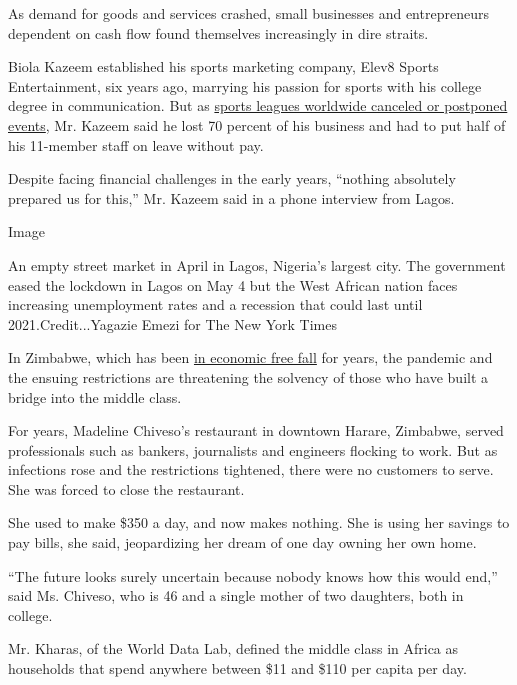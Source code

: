 As demand for goods and services crashed, small businesses and
entrepreneurs dependent on cash flow found themselves increasingly in
dire straits.

Biola Kazeem established his sports marketing company, Elev8 Sports
Entertainment, six years ago, marrying his passion for sports with his
college degree in communication. But as
\href{https://www.nytimes.com/article/coronavirus-sports-leagues-returning-canceled.html}{sports
leagues worldwide canceled or postponed events}, Mr. Kazeem said he lost
70 percent of his business and had to put half of his 11-member staff on
leave without pay.

Despite facing financial challenges in the early years, ``nothing
absolutely prepared us for this,'' Mr. Kazeem said in a phone interview
from Lagos.

Image

An empty street market in April in Lagos, Nigeria's largest city. The
government eased the lockdown in Lagos on May 4 but the West African
nation faces increasing unemployment rates and a recession that could
last until 2021.Credit...Yagazie Emezi for The New York Times

In Zimbabwe, which has been
\href{https://www.nytimes.com/2017/03/04/world/africa/zimbabwe-economy-work-force.html}{in
economic free fall} for years, the pandemic and the ensuing restrictions
are threatening the solvency of those who have built a bridge into the
middle class.

For years, Madeline Chiveso's restaurant in downtown Harare, Zimbabwe,
served professionals such as bankers, journalists and engineers flocking
to work. But as infections rose and the restrictions tightened, there
were no customers to serve. She was forced to close the restaurant.

She used to make \$350 a day, and now makes nothing. She is using her
savings to pay bills, she said, jeopardizing her dream of one day owning
her own home.

``The future looks surely uncertain because nobody knows how this would
end,'' said Ms. Chiveso, who is 46 and a single mother of two daughters,
both in college.

Mr. Kharas, of the World Data Lab, defined the middle class in Africa as
households that spend anywhere between \$11 and \$110 per capita per
day.

\href{https://www.nytimes.com/news-event/coronavirus?action=click\&pgtype=Article\&state=default\&region=MAIN_CONTENT_3\&context=storylines_faq}{}

